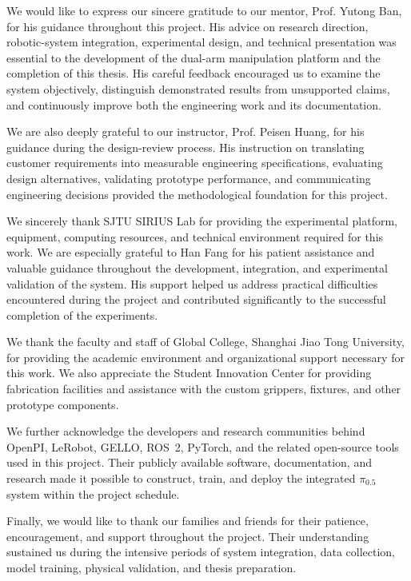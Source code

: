 
\begin{acknowledgements}
We would like to express our sincere gratitude to our mentor, Prof. Yutong Ban, for his guidance throughout this project. His advice on research direction, robotic-system integration, experimental design, and technical presentation was essential to the development of the dual-arm manipulation platform and the completion of this thesis. His careful feedback encouraged us to examine the system objectively, distinguish demonstrated results from unsupported claims, and continuously improve both the engineering work and its documentation.

We are also deeply grateful to our instructor, Prof. Peisen Huang, for his guidance during the design-review process. His instruction on translating customer requirements into measurable engineering specifications, evaluating design alternatives, validating prototype performance, and communicating engineering decisions provided the methodological foundation for this project.

We sincerely thank SJTU SIRIUS Lab for providing the experimental platform, equipment, computing resources, and technical environment required for this work. We are especially grateful to Han Fang for his patient assistance and valuable guidance throughout the development, integration, and experimental validation of the system. His support helped us address practical difficulties encountered during the project and contributed significantly to the successful completion of the experiments.

We thank the faculty and staff of Global College, Shanghai Jiao Tong University, for providing the academic environment and organizational support necessary for this work. We also appreciate the Student Innovation Center for providing fabrication facilities and assistance with the custom grippers, fixtures, and other prototype components.

We further acknowledge the developers and research communities behind OpenPI, LeRobot, GELLO, ROS~2, PyTorch, and the related open-source tools used in this project. Their publicly available software, documentation, and research made it possible to construct, train, and deploy the integrated $\pi_{0.5}$ system within the project schedule.

Finally, we would like to thank our families and friends for their patience, encouragement, and support throughout the project. Their understanding sustained us during the intensive periods of system integration, data collection, model training, physical validation, and thesis preparation.
\end{acknowledgements}

